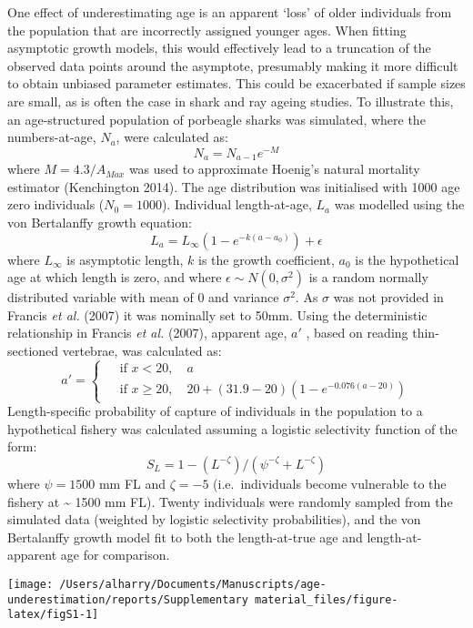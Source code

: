\documentclass[]{article}
\begin{document}
One effect of underestimating age is an apparent `loss' of older
individuals from the population that are incorrectly assigned younger
ages. When fitting asymptotic growth models, this would effectively lead
to a truncation of the observed data points around the asymptote,
presumably making it more difficult to obtain unbiased parameter
estimates. This could be exacerbated if sample sizes are small, as is
often the case in shark and ray ageing studies. To illustrate this, an
age-structured population of porbeagle sharks was simulated, where the
numbers-at-age, \(N_a\), were calculated as: \[N_a = N_{a-1}e^{-M}\]
where \(M = 4.3/A_{Max}\) was used to approximate Hoenig's natural
mortality estimator (Kenchington 2014). The age distribution was
initialised with 1000 age zero individuals (\(N_{0} = 1000\)).
Individual length-at-age, \(L_a\) was modelled using the von Bertalanffy
growth equation: \[L_{a} = L_\infty (1 - e^{-k(a-a_0)}) + \epsilon\]
where \(L_\infty\) is asymptotic length, \(k\) is the growth
coefficient, \(a_0\) is the hypothetical age at which length is zero,
and where \(\epsilon \sim N(0, \sigma^2)\) is a random normally
distributed variable with mean of 0 and variance \(\sigma^2\). As
\(\sigma\) was not provided in Francis \emph{et al.} (2007) it was
nominally set to 50mm. Using the deterministic relationship in Francis
\emph{et al.} (2007), apparent age, \(a'\) , based on reading
thin-sectioned vertebrae, was calculated as: \[ a' = \begin{cases}
 & \text{ if } x<20, \quad a\\ 
 & \text{ if } x\geq20, \quad 20 + (31.9 - 20)(1 - e^{-0.076 (a-20)}) 
\end{cases}\] Length-specific probability of capture of individuals in
the population to a hypothetical fishery was calculated assuming a
logistic selectivity function of the form:
\[ S_L = 1 - (L^{-\zeta})/(\psi^{-\zeta} + L^{-\zeta})\] where
\(\psi = 1500\) mm FL and \(\zeta = -5\) (i.e.~individuals become
vulnerable to the fishery at \textasciitilde{} 1500 mm FL). Twenty
individuals were randomly sampled from the simulated data (weighted by
logistic selectivity probabilities), and the von Bertalanffy growth
model fit to both the length-at-true age and length-at-apparent age for
comparison.

\begin{center}\texttt{[image: /Users/alharry/Documents/Manuscripts/age-underestimation/reports/Supplementary material\_files/figure-latex/figS1-1]} \end{center}
\end{document}
